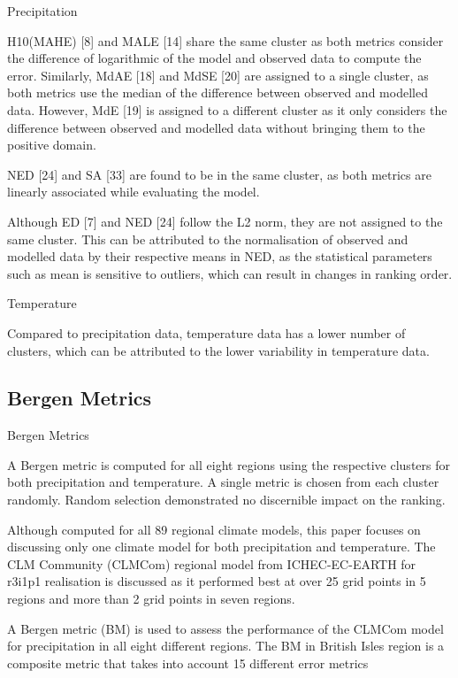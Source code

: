 \documentclass[xcolor={dvipsnames}]{beamer}
\begin{document}
\begin{frame}{Precipitation}

H10(MAHE) [8] and MALE [14] share the same cluster as both metrics consider the difference of logarithmic of the model and observed data to compute the error. Similarly, MdAE [18] and MdSE [20] are assigned to a single cluster, as both metrics use the median of the difference between observed and modelled data. However, MdE [19] is assigned to a different cluster as it only considers the difference between observed and modelled data without bringing them to the positive domain.

\hfill
\pause

NED [24] and SA [33] are found to be in the same cluster, as both metrics are linearly associated while evaluating the model.

\hfill
\pause

Although ED [7] and NED [24] follow the L2 norm, they are not assigned to the same cluster. This can be attributed to the normalisation of observed and modelled data by their respective means in NED, as the statistical parameters such as mean is sensitive to outliers, which can result in changes in ranking order.

\end{frame}

\begin{frame}{Temperature}

Compared to precipitation data, temperature data has a lower number of clusters, which can be attributed to the lower variability in temperature data.
    
\end{frame}

\subsection{Bergen Metrics}

\begin{frame}{Bergen Metrics}

A Bergen metric is computed for all eight regions using the respective clusters for both precipitation and temperature. A single metric is chosen from each cluster randomly. Random selection demonstrated no discernible impact on the ranking.

\hfill

Although computed for all 89 regional climate models, this paper focuses on discussing only one climate model for both precipitation and temperature. The CLM Community (CLMCom) regional model from ICHEC-EC-EARTH for r3i1p1 realisation is discussed as it performed best at over 25 grid points in 5 regions and more than 2 grid points in seven regions.

\hfill

A Bergen metric (BM) is used to assess the performance of the CLMCom model for precipitation in all eight different regions. The BM in British Isles region is a composite metric that takes into account 15 different error metrics
    
\end{frame}
\end{document}

